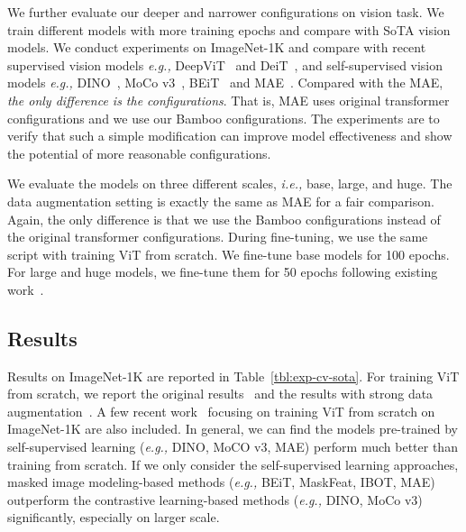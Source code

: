 \documentclass{article}
\theoremstyle{plain}
\theoremstyle{definition}
\theoremstyle{remark}
\newcommand{\ie}{\emph{i.e.,}\xspace}
\newcommand{\eg}{\emph{e.g.,}\xspace}
\begin{document}
We further evaluate our deeper and narrower configurations on vision task. We train different models with more training epochs and compare with SoTA vision models. We conduct experiments on ImageNet-1K and compare with recent supervised vision models \eg DeepViT~\citep{zhou2021deepvit} and DeiT~\citep{touvron2021training},  and self-supervised vision models \eg DINO~\citep{caron2021emerging}, MoCo v3~\citep{chen2021empirical}, BEiT~\citep{bao2021beit} and MAE~\citep{he2021masked}. Compared with the MAE, \textit{the only difference is the configurations}. That is, MAE uses original transformer configurations and we use our Bamboo configurations. The experiments are to verify that such a simple modification can improve model effectiveness and show the potential of more reasonable configurations. 

We evaluate the models on three different scales, \ie base, large, and huge. The data augmentation setting is exactly the same as MAE for a fair comparison. Again, the only difference is that we use the Bamboo configurations instead of the original transformer configurations. During fine-tuning, we use the same script with training ViT from scratch. We fine-tune base models for 100 epochs. For large and huge models, we fine-tune them for 50 epochs following existing work~\citep{bao2021beit, he2021masked}. 



\subsection{Results} 


Results on ImageNet-1K are reported in Table~\ref{tbl:exp-cv-sota}. For training ViT from scratch, we report the original results~\citep{dosovitskiy2020image} and the results with strong data augmentation~\citep{he2021masked}. A few recent work~\citep{zhou2021deepvit,touvron2021training} focusing on training ViT from scratch on ImageNet-1K are also included. In general, we can find the models pre-trained by self-supervised learning (\eg DINO, MoCO v3, MAE) perform much better than training from scratch. If we only consider the self-supervised learning approaches, masked image modeling-based methods (\eg BEiT, MaskFeat, IBOT, MAE) outperform the contrastive learning-based methods (\eg DINO, MoCo v3) significantly, especially on larger scale. 
\end{document}
